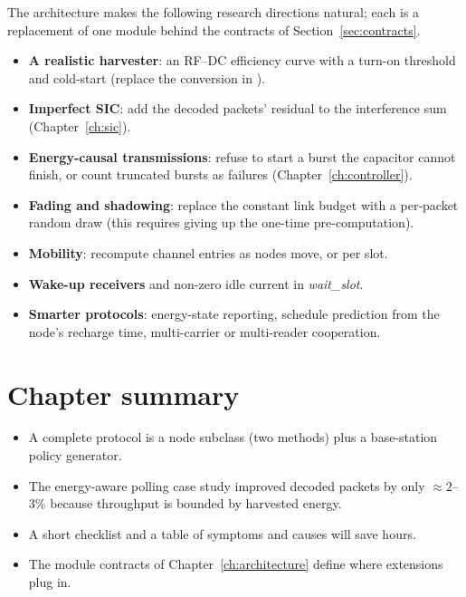 The architecture makes the following research directions natural; each is a replacement of one module behind the contracts of Section~\ref{sec:contracts}.
\begin{itemize}
 \item \textbf{A realistic harvester}: an RF--DC efficiency curve with a turn-on threshold and cold-start (replace the conversion in ).
 \item \textbf{Imperfect SIC}: add the decoded packets' residual to the interference sum (Chapter~\ref{ch:sic}).
 \item \textbf{Energy-causal transmissions}: refuse to start a burst the capacitor cannot finish, or count truncated bursts as failures (Chapter~\ref{ch:controller}).
 \item \textbf{Fading and shadowing}: replace the constant link budget with a per-packet random draw (this requires giving up the one-time pre-computation).
 \item \textbf{Mobility}: recompute channel entries as nodes move, or per slot.
 \item \textbf{Wake-up receivers} and non-zero idle current in \emph{wait\_slot}.
 \item \textbf{Smarter protocols}: energy-state reporting, schedule prediction from the node's recharge time, multi-carrier or multi-reader cooperation.
\end{itemize}

\section{Chapter summary}
\begin{itemize}
 \item A complete protocol is a node subclass (two methods) plus a base-station policy generator.
 \item The energy-aware polling case study improved decoded packets by only $\approx2$--$3\%$ because throughput is bounded by harvested energy.
 \item A short checklist and a table of symptoms and causes will save hours.
 \item The module contracts of Chapter~\ref{ch:architecture} define where extensions plug in.
\end{itemize}

